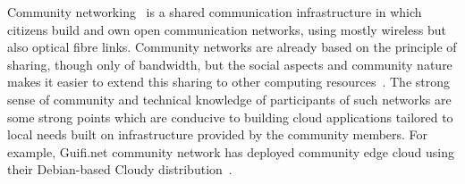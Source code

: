 
\label{sec__community_network_clouds}


Community networking~\cite{Braem2013} is a shared communication infrastructure in which citizens build and own open communication networks, using mostly wireless but also optical fibre links. 
%
Community networks are already based on the principle of sharing, though only of bandwidth, but the social aspects and community nature makes it easier to extend this sharing to other computing resources~\cite{Khan2015Incentive}.
The strong sense of community and technical knowledge of participants of such networks are some strong points which are conducive to building cloud applications tailored to local needs built on infrastructure provided by the community members.
For example, Guifi.net community network
has deployed community edge cloud using their Debian-based Cloudy distribution~\cite{Baig2015Community}.

%
%
%
%

